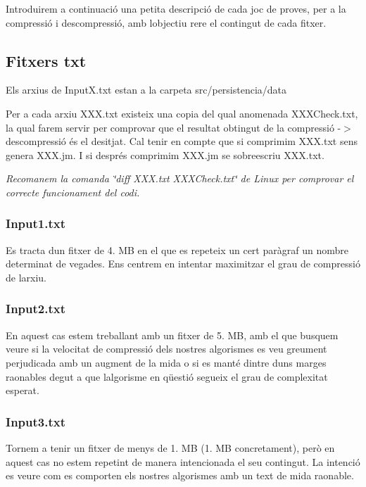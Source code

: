 Introduirem a continuació una petita descripció de cada joc de proves, per a la compressió i descompressió, amb l\textquotesingle{}objectiu rere el contingut de cada fitxer.

\subsection*{Fitxers txt}

Els arxius de Input\+X.\+txt estan a la carpeta src/persistencia/data

Per a cada arxiu X\+X\+X.\+txt existeix una copia del qual anomenada X\+X\+X\+Check.\+txt, la qual farem servir per comprovar que el resultat obtingut de la compressió -\/$>$ descompressió és el desitjat. Cal tenir en compte que si comprimim X\+X\+X.\+txt se\textquotesingle{}ns genera X\+X\+X.\+jm. I si després comprimim X\+X\+X.\+jm se sobreescriu X\+X\+X.\+txt.

{\itshape Recomanem la comanda \char`\"{}diff X\+X\+X.\+txt X\+X\+X\+Check.\+txt\char`\"{} de Linux per comprovar el correcte funcionament del codi.}

\subsubsection*{Input1.\+txt}

Es tracta d\textquotesingle{}un fitxer de 4. MB en el que es repeteix un cert paràgraf un nombre determinat de vegades. Ens centrem en intentar maximitzar el grau de compressió de l\textquotesingle{}arxiu.

\subsubsection*{Input2.\+txt}

En aquest cas estem treballant amb un fitxer de 5. MB, amb el que busquem veure si la velocitat de compressió dels nostres algorismes es veu greument perjudicada amb un augment de la mida o si es manté dintre d\textquotesingle{}uns marges raonables degut a que l\textquotesingle{}algorisme en qüestió segueix el grau de complexitat esperat.

\subsubsection*{Input3.\+txt}

Tornem a tenir un fitxer de menys de 1. MB (1. MB concretament), però en aquest cas no estem repetint de manera intencionada el seu contingut. La intenció es veure com es comporten els nostres algorismes amb un text de mida raonable.

